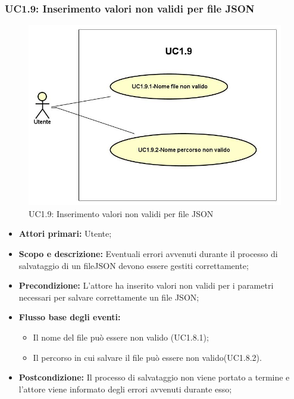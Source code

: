 \subsubsection{UC1.9: Inserimento valori non validi per file JSON} 
\begin{figure} [H]
	\centering
	\includegraphics[scale=0.45]{Img/UC1-9} 
	\caption{UC1.9: Inserimento valori non validi per file JSON} \label{} 
\end{figure} 
\begin{itemize} 
	\item{\textbf{Attori primari:} Utente;} 
	\item{\textbf{Scopo e descrizione:} Eventuali errori avvenuti durante il processo di salvataggio di un fileJSON devono essere gestiti correttamente;} 
	\item{\textbf{Precondizione:} L'attore ha inserito valori non validi per i parametri necessari per salvare correttamente un file JSON;} 
	\item{\textbf{Flusso base degli eventi:} } 
	\begin{itemize} 
		\item{Il nome del file può essere non valido (UC1.8.1);} 
		\item{Il percorso in cui salvare il file può essere non valido(UC1.8.2).} 
	\end{itemize} 
	\item{\textbf{Postcondizione:} Il processo di salvataggio non viene portato a termine e l'attore viene informato degli errori avvenuti durante esso;} 
\end{itemize} 
